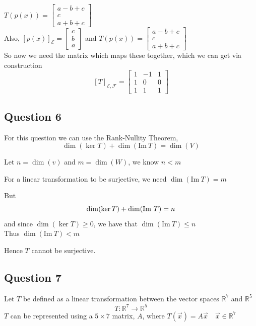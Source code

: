 \documentclass{article}
\begin{document}
\(T(p(x)) = \begin{bmatrix}
    a -b + c \\
    c \\
    a + b +c
\end{bmatrix}\)
\\

Also, \([p(x)]_\mathcal{E} = \begin{bmatrix}
    c \\ 
    b \\ 
    a
\end{bmatrix}\) and \(T(p(x)) = \begin{bmatrix}
    a -b + c \\
    c \\
    a + b +c
\end{bmatrix}\)
\\

So now we need the matrix which maps these together, which we can get via construction
\[
[T]_{\mathcal{E},\mathcal{F}} = \begin{bmatrix}
    1 & -1 & 1 \\
    1 & 0 & 0 \\
    1 & 1 & 1
\end{bmatrix}
\]


\subsection*{Question 6}

For this question we can use the Rank-Nullity Theorem, 
\[
\dim(\ker T) + \dim(\mathrm{Im} \ T) = \dim(V)
\]

Let \(n = \dim(v)\) and \(m = \dim(W)\), we know \(n < m\)

For a linear transformation to be surjective, we need \(\dim(\mathrm{Im} \ T) = m\)

But
\[
\dim(\ker T) + \dim(\mathrm{Im} \ T) = n \\
\]
and since \(\dim(\ker T) \geq 0 \), we have that \(\dim(\mathrm{Im} \ T) \leq n\)
\\

Thus \(\dim(\mathrm{Im} \ T) < m\)

Hence \(T\) cannot be surjective.

\subsection*{Question 7}
Let \(T\) be defined as a linear transformation between the vector spaces \(\mathbb{R}^7\) and 
\(\mathbb{R}^5\)
\[
T: \mathbb{R}^7 \rightarrow \mathbb{R}^5
\]
\(T\) can be represented using a \(5 \times 7\) matrix, \(A\), where 
\(T(\vec{x}) = A\vec{x} \quad \vec{x} \in \mathbb{R}^7\)
\\
\end{document}
